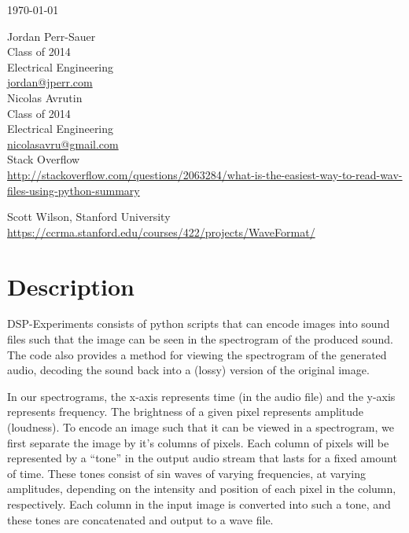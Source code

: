 \documentclass[12pt,letterpaper]{article}
\begin{document}
\vspace{1in}
\doublespacing


\noindent
\today
\vspace{1cm}

\noindent
Jordan Perr-Sauer\\
Class of 2014\\
Electrical Engineering\\
\url{jordan@jperr.com}\\

\noindent
Nicolas Avrutin\\
Class of 2014\\
Electrical Engineering\\
\url{nicolasavru@gmail.com}\\

\noindent
Stack Overflow\\
\url{http://stackoverflow.com/questions/2063284/what-is-the-easiest-way-to-read-wav-files-using-python-summary}

\noindent
Scott Wilson, Stanford University\\
\url{https://ccrma.stanford.edu/courses/422/projects/WaveFormat/}



\section{Description}

DSP-Experiments consists of python scripts that can encode images into sound files such that the image can be seen in the spectrogram of the produced sound. The code also provides a method for viewing the spectrogram of the generated audio, decoding the sound back into a (lossy) version of the original image.

In our spectrograms, the x-axis represents time (in the audio file) and the y-axis represents frequency. The brightness of a given pixel represents amplitude (loudness). To encode an image such that it can be viewed in a spectrogram, we first separate the image by it's columns of pixels. Each column of pixels will be represented by a ``tone'' in the output audio stream that lasts for a fixed amount of time. These tones consist of sin waves of varying frequencies, at varying amplitudes, depending on the intensity and position of each pixel in the column, respectively. Each column in the input image is converted into such a tone, and these tones are concatenated and output to a wave file.
\end{document}
